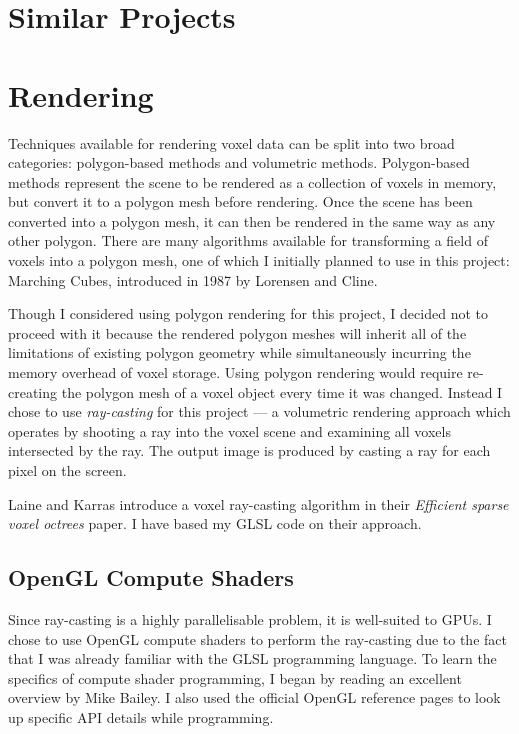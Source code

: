 \section{Similar Projects}


\section{Rendering}
Techniques available for rendering voxel data can be split into two broad categories: polygon-based methods and volumetric methods. Polygon-based methods represent the scene to be rendered as a collection of voxels in memory, but convert it to a polygon mesh before rendering. Once the scene has been converted into a polygon mesh, it can then be rendered in the same way as any other polygon. There are many algorithms available for transforming a field of voxels into a polygon mesh, one of which I initially planned to use in this project: Marching Cubes, introduced in 1987 by Lorensen and Cline\autocite{lorensen1987marching}.

Though I considered using polygon rendering for this project, I decided not to proceed with it because the rendered polygon meshes will inherit all of the limitations of existing polygon geometry while simultaneously incurring the memory overhead of voxel storage. Using polygon rendering would require re-creating the polygon mesh of a voxel object every time it was changed. Instead I chose to use \textit{ray-casting} for this project --- a volumetric rendering approach which operates by shooting a ray into the voxel scene and examining all voxels intersected by the ray. The output image is produced by casting a ray for each pixel on the screen.

Laine and Karras introduce a voxel ray-casting algorithm in their \textit{Efficient sparse voxel octrees} paper\autocite{laine2010efficient}. I have based my GLSL code on their approach.

\subsection{OpenGL Compute Shaders}
Since ray-casting is a highly parallelisable problem, it is well-suited to GPUs. I chose to use OpenGL compute shaders to perform the ray-casting due to the fact that I was already familiar with the GLSL programming language. To learn the specifics of compute shader programming, I began by reading an excellent overview by Mike Bailey\autocite{bailey2014}. I also used the official OpenGL reference pages to look up specific API details while programming\autocite{gldocs}.

